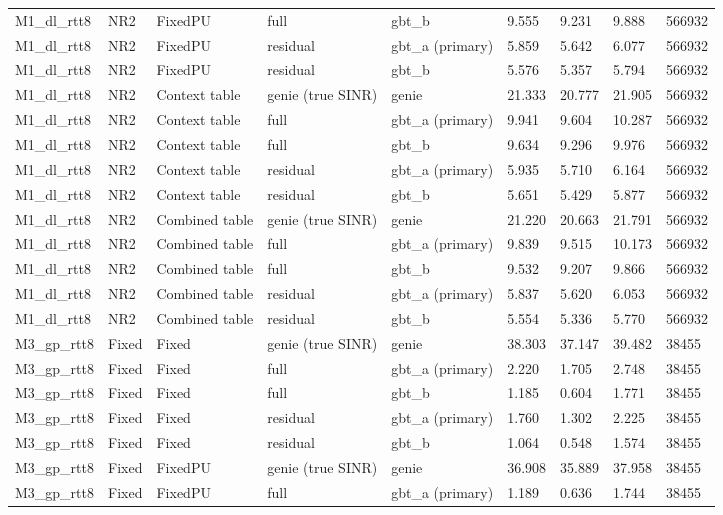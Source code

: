\documentclass[10pt]{article}
\begin{document}
\begin{landscape}
\begin{longtable}{@{}lllllllll@{}}
M1\_dl\_rtt8 & NR2 & FixedPU & full & gbt\_b & 9.555 & 9.231 & 9.888 & 566932 \\
M1\_dl\_rtt8 & NR2 & FixedPU & residual & gbt\_a (primary) & 5.859 & 5.642 & 6.077 & 566932 \\
M1\_dl\_rtt8 & NR2 & FixedPU & residual & gbt\_b & 5.576 & 5.357 & 5.794 & 566932 \\
M1\_dl\_rtt8 & NR2 & Context table & genie (true SINR) & genie & 21.333 & 20.777 & 21.905 & 566932 \\
M1\_dl\_rtt8 & NR2 & Context table & full & gbt\_a (primary) & 9.941 & 9.604 & 10.287 & 566932 \\
M1\_dl\_rtt8 & NR2 & Context table & full & gbt\_b & 9.634 & 9.296 & 9.976 & 566932 \\
M1\_dl\_rtt8 & NR2 & Context table & residual & gbt\_a (primary) & 5.935 & 5.710 & 6.164 & 566932 \\
M1\_dl\_rtt8 & NR2 & Context table & residual & gbt\_b & 5.651 & 5.429 & 5.877 & 566932 \\
M1\_dl\_rtt8 & NR2 & Combined table & genie (true SINR) & genie & 21.220 & 20.663 & 21.791 & 566932 \\
M1\_dl\_rtt8 & NR2 & Combined table & full & gbt\_a (primary) & 9.839 & 9.515 & 10.173 & 566932 \\
M1\_dl\_rtt8 & NR2 & Combined table & full & gbt\_b & 9.532 & 9.207 & 9.866 & 566932 \\
M1\_dl\_rtt8 & NR2 & Combined table & residual & gbt\_a (primary) & 5.837 & 5.620 & 6.053 & 566932 \\
M1\_dl\_rtt8 & NR2 & Combined table & residual & gbt\_b & 5.554 & 5.336 & 5.770 & 566932 \\
M3\_gp\_rtt8 & Fixed & Fixed & genie (true SINR) & genie & 38.303 & 37.147 & 39.482 & 38455 \\
M3\_gp\_rtt8 & Fixed & Fixed & full & gbt\_a (primary) & 2.220 & 1.705 & 2.748 & 38455 \\
M3\_gp\_rtt8 & Fixed & Fixed & full & gbt\_b & 1.185 & 0.604 & 1.771 & 38455 \\
M3\_gp\_rtt8 & Fixed & Fixed & residual & gbt\_a (primary) & 1.760 & 1.302 & 2.225 & 38455 \\
M3\_gp\_rtt8 & Fixed & Fixed & residual & gbt\_b & 1.064 & 0.548 & 1.574 & 38455 \\
M3\_gp\_rtt8 & Fixed & FixedPU & genie (true SINR) & genie & 36.908 & 35.889 & 37.958 & 38455 \\
M3\_gp\_rtt8 & Fixed & FixedPU & full & gbt\_a (primary) & 1.189 & 0.636 & 1.744 & 38455 \\

\end{longtable}
\end{landscape}
\end{document}
